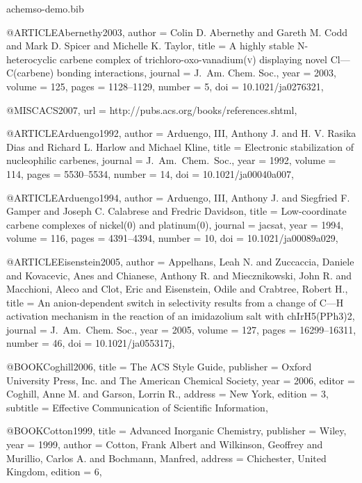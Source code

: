 \begin{filecontents}[noheader]{achemso-demo.bib}

@ARTICLE{Abernethy2003,
  author = {Colin D. Abernethy and Gareth M. Codd and Mark D. Spicer
    and Michelle K. Taylor},
  title = {A highly stable {N}-heterocyclic carbene complex of
    trichloro-oxo-vanadium(\textsc{v}) displaying novel
    {Cl}---{C}(carbene) bonding interactions},
  journal = {J.~Am. Chem. Soc.},
  year = {2003},
  volume = {125},
  pages = {1128--1129},
  number = {5},
  doi = {10.1021/ja0276321},
}

@MISC{ACS2007,
  url = {http://pubs.acs.org/books/references.shtml},
}

@ARTICLE{Arduengo1992,
  author = {Arduengo, III, Anthony J. and H. V. Rasika Dias and
    Richard L. Harlow and Michael Kline},
  title = {Electronic stabilization of nucleophilic carbenes},
  journal = {J.~Am.\ Chem.\ Soc.},
  year = {1992},
  volume = {114},
  pages = {5530--5534},
  number = {14},
  doi = {10.1021/ja00040a007},
}

@ARTICLE{Arduengo1994,
  author = {Arduengo, III, Anthony J. and Siegfried F. Gamper and
    Joseph C. Calabrese and Fredric Davidson},
  title = {{Low}-coordinate carbene complexes of nickel(0) and
    platinum(0)},
  journal = jacsat,
  year = {1994},
  volume = {116},
  pages = {4391--4394},
  number = {10},
  doi = {10.1021/ja00089a029},
}

@ARTICLE{Eisenstein2005,
  author = {Appelhans, Leah N. and Zuccaccia, Daniele and Kovacevic,
    Anes and Chianese, Anthony R. and Miecznikowski, John R. and
    Macchioni, Aleco and Clot, Eric and Eisenstein, Odile and
    Crabtree, Robert H.},
  title = {An anion-dependent switch in selectivity results from a
    change of {C}---{H} activation mechanism in the reaction of an
    imidazolium salt with ch{IrH5(PPh3)2}},
  journal = {J.~Am.\ Chem. Soc.},
  year = {2005},
  volume = {127},
  pages = {16299--16311},
  number = {46},
  doi = {10.1021/ja055317j},
}

@BOOK{Coghill2006,
  title = {The {ACS} Style Guide},
  publisher = {Oxford University Press, Inc. and
               The American Chemical Society},
  year = {2006},
  editor = {Coghill, Anne M. and Garson, Lorrin R.},
  address = {New York},
  edition = {3},
  subtitle = {{Effective} Communication of Scientific
    Information},
}

@BOOK{Cotton1999,
  title = {Advanced Inorganic Chemistry},
  publisher = {Wiley},
  year = {1999},
  author = {Cotton, Frank Albert and Wilkinson, Geoffrey and
    Murillio, Carlos A. and Bochmann, Manfred},
  address = {Chichester, United Kingdom},
  edition = {6},
}


\end{filecontents}
